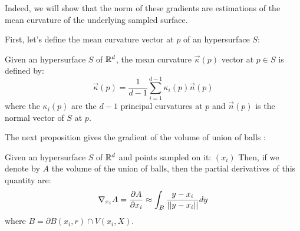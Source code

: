 Indeed, we will show that the norm of these gradients are estimations of the
mean curvature of the underlying sampled surface.

First, let's define the mean curvature vector at $ p $ of an hypersurface $ S $:
\begin{definition}
    Given an hypersurface $ S $ of $ \mathbb{R}^d $, the mean curvature $ \vec{\kappa}(p) $ vector at $ p
    \in S $ is defined by:
    $$ \vec{\kappa}(p) = \frac{1}{d-1} \sum_{i=1}^{d-1} \kappa_i(p) \vec{n}(p) $$
    where the $ \kappa_i(p) $ are the $ d - 1 $ principal curvatures at $ p $
    and $ \vec{n}(p) $ is the normal vector of $ S $ at $ p $.
\end{definition}

The next proposition gives the gradient of the volume of union of balls :
\begin{proposition}
    Given an hypersurface $ S $ of $ \mathbb{R}^d $ and points sampled on it: $ (x_i) $
    Then, if we denote by $ A $ the volume of the union of balls, then the
    partial derivatives of this quantity are:
    \begin{equation}
        \label{eqn:gradient_area_2d}
        \nabla_{x_i} A = \frac{\partial{A}}{\partial{x_i}} \approx \int_{B} \frac{y - x_i}{||y - x_i||} dy
    \end{equation}
    where $ B = \partial B(x_i, r) \cap V(x_i, X) $.
\end{proposition}

